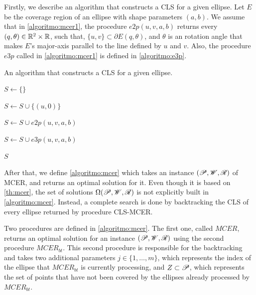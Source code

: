 Firstly, we describe an algorithm that constructs a CLS for a given ellipse.
Let $E$ be the coverage region of an ellipse with shape parameters $(a, b)$. We assume that in \autoref{algoritmo:mcer1}, the procedure $e2p(u, v, a, b)$ returns every $(q, \theta) \in \mathbb{R}^2\times\mathbb{R}$, such that, $\{u, v\}\subset \partial E(q, \theta)$, and $\theta$ is an rotation angle that makes $E$'s major-axis parallel to the line defined by $u$ and $v$. Also, the procedure $e3p$ called in \autoref{algoritmo:mcer1} is defined in \autoref{algoritmo:e3p}.

\begin{algoritmo}
	\caption{An algorithm that constructs a CLS for a given ellipse.}\label{algoritmo:mcer1}
	\begin{algorithmic}[1]
		
		
		\item[]
		
		\State $S \gets \{\}$
		
		\State $S \gets S \cup \{(u, 0)\}$
		\EndFor
		
		\State $S \gets S \cup e2p(u, v, a, b)$
		\EndFor
		
		\State $S \gets S \cup e3p(u, v, a, b)$ 
		\EndFor
		
		\State \Return $S$
		\EndProcedure
	\end{algorithmic}
\end{algoritmo}

After that, we define \autoref{algoritmo:mcer} which takes an instance $(\mathscr{P}, \mathscr{W}, \mathscr{R})$ of MCER, and returns an optimal solution for it.
Even though it is based on \autoref{th:mcer}, the set of solutions $\Omega(\mathscr{P}, \mathscr{W}, \mathscr{R})$ is not explicitly built in \autoref{algoritmo:mcer}. Instead, a complete search is done by backtracking the CLS of every ellipse returned by procedure CLS-MCER.

Two procedures are defined in \autoref{algoritmo:mcer}. The first one, called $MCER$, returns an optimal solution for an instance $(\mathscr{P}, \mathscr{W}, \mathscr{R})$ using the second procedure $MCER_{bt}$. This second procedure is responsible for the backtracking and takes two additional parameters $j\in\{1, \dots, m\}$, which represents the index of the ellipse that $MCER_{bt}$ is currently processing, and $Z\subset \mathscr{P}$, which represents the set of points that have not been covered by the ellipses already processed by $MCER_{bt}$.


